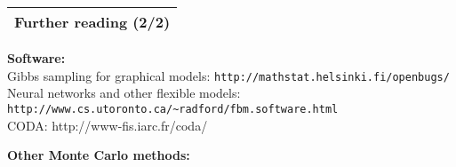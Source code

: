 \documentclass[25pt,landscape]{foils}
\newcommand{\Gray}{\textcolor{mygray}}
\newcommand{\myfoilhead}[1]{
\newpage
\vspace*{-1cm}
\Gray{
\begin{tabular*}{\textwidth}{l}
{\bf \Huge #1} \\
\bottomrule
\end{tabular*}}}
\begin{document}
\myfoilhead{Further reading (2/2)}

\vfill

{\bf Software:}\\[-0.3in]

{\tiny
Gibbs sampling for graphical models: \texttt{http://mathstat.helsinki.fi/openbugs/}\\[-0.2in]

Neural networks and other flexible models: \texttt{http://www.cs.utoronto.ca/\~{}radford/fbm.software.html}\\[-0.4in]

CODA: http://www-fis.iarc.fr/coda/
}

\bigskip

{\bf Other Monte Carlo methods:}\\[-0.3in]
\end{document}
